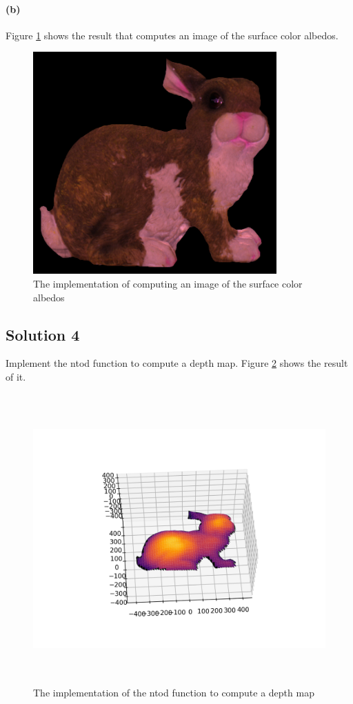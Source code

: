 \documentclass{article}
\newcommand{\solution}[1]{\clearpage \subsection*{Solution #1}}
\newcommand{\spart}[1]{\paragraph{(#1)}}
\begin{document}
\spart{b}Figure \ref{fig:prob3b} shows the result that computes an image of the surface color albedos.
\begin{figure}[!h]
  \centering
    \includegraphics[height=23em]{code/outputs/prob3_alb.png}
  \caption{The implementation of computing an image of the surface color albedos}
  \label{fig:prob3b}
\end{figure}

\solution{4} 
Implement the ntod function to compute a depth map. Figure \ref{fig:prob4} shows the result of it.
\begin{figure}[!h]
  \centering
    \includegraphics[height=30em]{code/outputs/prob4.png}
  \caption{The implementation of the ntod function to compute a depth map}
  \label{fig:prob4}
\end{figure}
\end{document}
